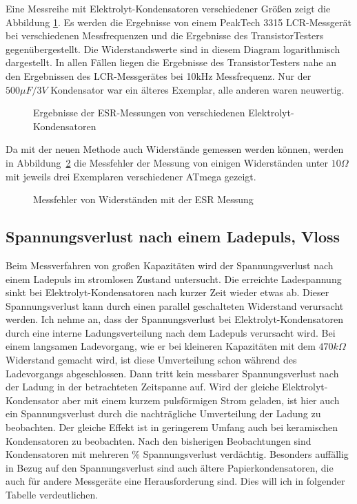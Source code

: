Eine Messreihe mit Elektrolyt-Kondensatoren verschiedener Größen zeigt die Abbildung \ref{fig:ElcoESR}.
Es werden die Ergebnisse von einem PeakTech 3315 LCR-Messgerät bei verschiedenen Messfrequenzen und die
Ergebnisse des TransistorTesters gegenübergestellt. Die Widerstandswerte sind in diesem Diagram logarithmisch dargestellt.
In allen Fällen liegen die Ergebnisse des TransistorTesters
nahe an den Ergebnissen des LCR-Messgerätes bei 10kHz Messfrequenz. 
Nur der \(500 \mu F/3V\) Kondensator war ein älteres Exemplar, alle anderen waren neuwertig.

\begin{figure}[H]
\centering

\caption{Ergebnisse der ESR-Messungen von verschiedenen Elektrolyt-Kondensatoren}
\label{fig:ElcoESR}
\end{figure}

Da mit der neuen Methode auch Widerstände gemessen werden können, werden in Abbildung~\ref{fig:res_esr} die
Messfehler der Messung von einigen Widerständen unter \(10 \Omega\) mit jeweils drei Exemplaren verschiedener
ATmega gezeigt.  

\begin{figure}[H]
\centering

\caption{Messfehler von Widerständen mit der ESR Messung}
\label{fig:res_esr}
\end{figure}


\subsection{Spannungsverlust nach einem Ladepuls, Vloss}
Beim Messverfahren von großen Kapazitäten wird der Spannungsverlust nach einem Ladepuls im stromlosen Zustand untersucht.
Die erreichte Ladespannung sinkt bei Elektrolyt-Kondensatoren nach kurzer Zeit wieder etwas ab.
Dieser Spannungsverlust kann durch einen parallel geschalteten Widerstand verursacht werden.
Ich nehme an, dass der Spannungsverlust bei Elektrolyt-Kondensatoren durch eine interne Ladungsverteilung nach
dem Ladepuls verursacht wird. Bei einem langsamen Ladevorgang, wie er bei kleineren Kapazitäten mit dem \(470 k\Omega\) Widerstand
gemacht wird, ist diese Umverteilung schon während des Ladevorgangs abgeschlossen. Dann tritt kein messbarer Spannungsverlust nach
der Ladung in der betrachteten Zeitspanne auf. Wird der gleiche Elektrolyt-Kondensator aber mit einem
kurzem pulsförmigen Strom geladen, ist hier auch ein Spannungsverlust durch die nachträgliche Umverteilung
der Ladung zu beobachten. Der gleiche Effekt ist in geringerem Umfang auch bei keramischen Kondensatoren zu beobachten. 
Nach den bisherigen Beobachtungen sind Kondensatoren mit mehreren \% Spannungsverlust verdächtig.
Besonders auffällig in Bezug auf den Spannungsverlust sind auch ältere Papierkondensatoren, die auch für andere Messgeräte
eine Herausforderung sind. Dies will ich in folgender Tabelle verdeutlichen.
\vspace{0.5 cm}

